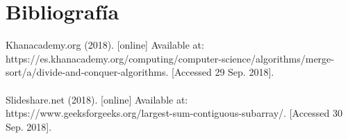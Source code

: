 \documentclass[12pt,twoside]{article}
\begin{document}
\section{Bibliograf\'ia}
Khanacademy.org (2018). [online] Available at: https://es.khanacademy.org/computing/computer-science/algorithms/merge-sort/a/divide-and-conquer-algorithms. [Accessed 29 Sep. 2018].\\\\
Slideshare.net (2018). [online] Available at: https://www.geeksforgeeks.org/largest-sum-contiguous-subarray/. [Accessed  30 Sep. 2018].
\end{document}
